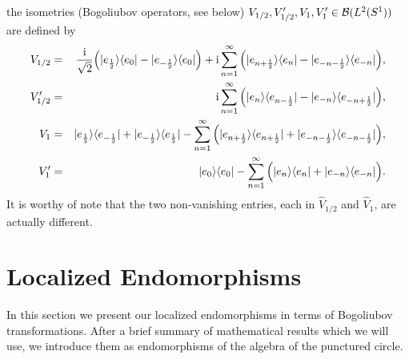 \documentclass[10pt,a4paper]{article}
\begin{document}
the isometries (Bogoliubov operators, see below)
$V_{1/2},V_{1/2}',V_1,V_1'\in{\cal B}(L^2(S^1))$
are defined by
\begin{eqnarray*}
V_{1/2} &=& \frac{{\rm i}}{\sqrt{2}}\Big(|e_\frac{1}{2}
\rangle\langle e_0|-|e_{-\frac{1}{2}}\rangle
\langle e_0|\Big) + {\rm i} \sum_{n=1}^\infty \Big(
|e_{n+\frac{1}{2}}\rangle\langle
e_n|-|e_{-n-\frac{1}{2}}\rangle\langle
e_{-n}|\Big),  \\
V_{1/2}' &=&  {\rm i} \sum_{n=1}^\infty \Big( |e_n
\rangle\langle e_{n-\frac{1}{2}}|-|e_{-n} \rangle
\langle e_{-n+\frac{1}{2}}| \Big),\\
V_1 &=&  |e_\frac{1}{2}\rangle\langle e_{-\frac{1}{2}}|+
|e_{-\frac{1}{2}}\rangle\langle e_\frac{1}{2}|
- \sum_{n=1}^\infty \Big(|e_{n+\frac{1}{2}}\rangle\langle
e_{n+\frac{1}{2}}|+|e_{-n-\frac{1}{2}}\rangle\langle
e_{-n-\frac{1}{2}}| \Big), \\
V_1' &=& |e_0\rangle\langle e_0| -\sum_{n=1}^\infty
\Big( |e_n\rangle\langle e_n|+|e_{-n}\rangle\langle
e_{-n}| \Big).
\end{eqnarray*}
It is worthy of note that the two non-vanishing entries,
each in $\hat{V}_{1/2}$ and $\hat{V}_1$, are
actually different.

\section{Localized Endomorphisms}
In this section we present our localized
endomorphisms in terms of Bogoliubov transformations.
After a brief summary of mathematical results which
we will use, we introduce them as endomorphisms of the
algebra of the punctured circle.
\end{document}
